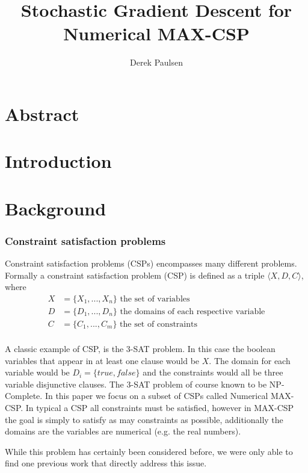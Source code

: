 \documentclass[a4paper]{article}
\title{Stochastic Gradient Descent for Numerical MAX-CSP} %
\author{
Derek Paulsen \\
}
\date{}
\begin{document}
\maketitle 


\section{Abstract}
\section{Introduction}
\section{Background}


\subsubsection{Constraint satisfaction problems}

Constraint satisfaction problems (CSPs) encompasses many different problems. Formally a 
constraint satisfaction problem (CSP) is defined as a triple $\langle X, D, C \rangle$, where 
\begin{align*}
	X &= \{X_1, ..., X_n\} \text{ the set of variables}\\
	D &= \{D_1, ..., D_n\} \text{ the domains of each respective variable}\\
	C &= \{C_1, ..., C_m\} \text{ the set of constraints}\\
\end{align*}

A classic example of CSP, is the 3-SAT problem. In this case
the boolean variables that appear in at least one clause would be $X$. The domain for 
each variable would be $D_i = \{true, false\}$ and the constraints would all be 
three variable disjunctive clauses. The 3-SAT problem of course known to be NP-Complete.
In this paper we focus on a subset of CSPs called Numerical MAX-CSP. 
In typical a CSP all constraints must be satisfied, however in MAX-CSP the goal is simply to 
satisfy as may constraints as possible, additionally the domains are the variables 
are numerical (e.g. the real numbers). 

While this problem has certainly been considered before, we were only able to find one previous 
work that directly address this issue. 
\end{document}
